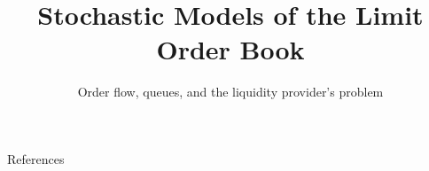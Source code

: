 \documentclass[aspectratio=169,10pt]{beamer}
\title{Stochastic Models of the Limit Order Book}
\subtitle{Order flow, queues, and the liquidity provider's problem}
\begin{document}
\maketitle










\appendix


\begin{frame}[allowframebreaks]{References}
  \tiny
  \renewcommand{\bibsection}{}
  \nocite{gould2013limit,abergel2016limit,bouchaud2018trades,cartea2015algorithmic,glosten1985bid,kyle1985continuous}
  
  
\end{frame}
\end{document}
